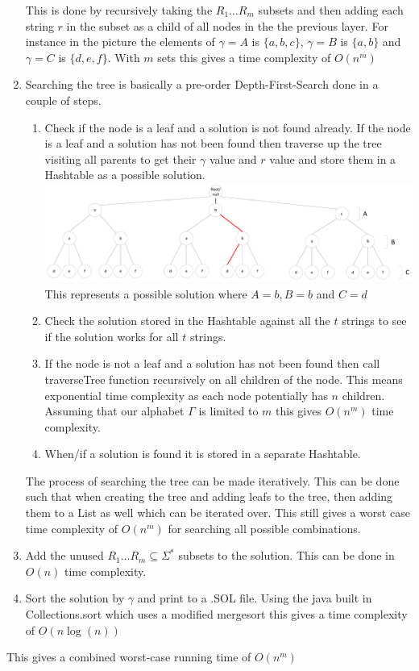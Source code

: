 \documentclass[paper=a4, fontsize=11pt]{scrartcl}
\numberwithin{equation}{section}		%
\numberwithin{figure}{section}			%
\numberwithin{table}{section}				%
\begin{document}
\begin{enumerate}
	This is done by recursively taking the $R_1\ldots R_m$ subsets and then adding each string $r$ in the subset as a child of all nodes in the the previous layer. For instance in the picture the elements of $\gamma =A$ is $\{a,b,c\}$, $\gamma =B$ is $\{a,b\}$ and $\gamma =C$ is $\{d,e,f\}$. With $m$ sets this gives a time complexity of $O(n^m)$
	\item
	Searching the tree is basically a pre-order Depth-First-Search done in a couple of steps.
	\begin{enumerate}
		\item
		Check if the node is a leaf and a solution is not found already. If the node is a leaf and a solution has not been found then traverse up the tree visiting all parents to get their $\gamma$ value and $r$ value and store them in a Hashtable as a possible solution.
		\includegraphics[width=1\textwidth]{imgs/TreePossibleSol.pdf}
		This represents a possible solution where $A=b, B=b$ and $C=d$
		\item
		Check the solution stored in the Hashtable against all the $t$ strings to see if the solution works for all $t$ strings.
		\item
		If the node is not a leaf and a solution has not been found then call traverseTree function recursively on all children of the node. This means exponential time complexity as each node potentially has $n$ children. Assuming that our alphabet $\Gamma$ is limited to $m$ this gives $O(n^m)$ time complexity.
		\item
		When/if a solution is found it is stored in a separate Hashtable.
	\end{enumerate}
	The process of searching the tree can be made iteratively. This can be done such that when creating the tree and adding leafs to the tree, then adding them to a List as well which can be iterated over. This still gives a worst case time complexity of $O(n^m)$ for searching all possible combinations.
	\item
	Add the unused $R_1\ldots R_m \subseteq \Sigma^*$ subsets to the solution. This can be done in $O(n)$ time complexity.
	\item
	Sort the solution by $\gamma$ and print to a .SOL file. Using the java built in Collections.sort which uses a modified mergesort this gives a time complexity of $O(n \log(n))$ 
\end{enumerate}
This gives a combined worst-case running time of $O(n^m)$
\end{document}
